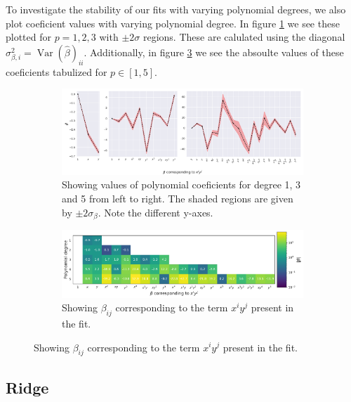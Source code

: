 \documentclass[twocolumn,english,notitlepage]{article}
\renewcommand{\var}{\operatorname{Var}}
\begin{document}
    To investigate the stability of our fits with varying polynomial degrees, we also plot coeficient values with varying polynomial degree. In figure \ref{fig:res:OLS_beta_values_plot} we see these plotted for $p = 1,2,3$ with $\pm 2\sigma$ regions. These are calulated using the diagonal $\sigma^2_{\beta,i} = \var{(\hat{\beta})_{ii}}$. Additionally, in figure \ref{fig:res:OLS_beta_values_table} we see the absoulte values of these coeficients tabulized for $p \in [1,5]$.

    \begin{figure}
        \begin{subfigure}{\textwidth}
            \centering
            \includegraphics[width=\linewidth]{linreg_coefs_plots.pdf}
            \caption{Showing values of polynomial coeficients for degree 1, 3 and 5 from left to right. The shaded regions are given by $\pm 2\sigma_\beta$. Note the different y-axes.} 
            \label{fig:res:OLS_beta_values_plot}
        \end{subfigure}
        \begin{subfigure}{\textwidth}
            \centering
            \includegraphics[width=\linewidth]{linreg_coefs_table.pdf}
            \caption{Showing $\beta_{ij}$ corresponding to the term $x^i y^j$ present in the fit.}
            \label{fig:res:OLS_beta_values_table}    
        \end{subfigure}
    \end{figure}

    \subsection{Ridge}
\end{document}
